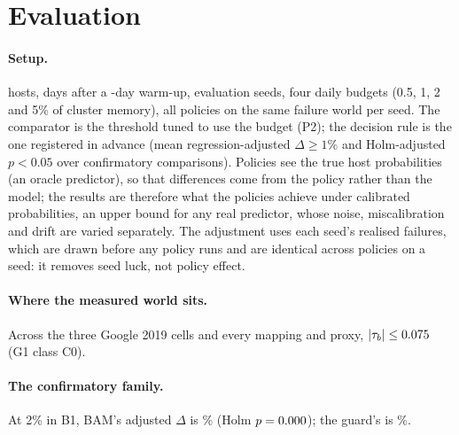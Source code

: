 \section{Evaluation}
\label{sec:eval}

\paragraph{Setup.}
\VHosts{} hosts, \VHorizonDays{} days after a \VWarmupDays-day warm-up, \VEvalSeeds{} evaluation
seeds, four daily budgets (0.5, 1, 2 and 5\% of cluster memory), all policies on the same failure
world per seed. The comparator is the threshold tuned to use the budget (P2); the decision rule is
the one registered in advance (mean regression-adjusted $\Delta \geq 1\%$ and Holm-adjusted
$p<0.05$ over \VFamilySize{} confirmatory comparisons). Policies see the true host probabilities (an
oracle predictor), so that differences come from the policy rather than the model; the results
are therefore what the policies achieve under calibrated probabilities, an upper bound for any
real predictor, whose noise, miscalibration and drift are varied separately. The adjustment uses
each seed's realised failures, which are drawn before any policy runs and are identical across
policies on a seed: it removes seed luck, not policy effect.

\paragraph{Where the measured world sits.}
Across the three Google 2019 cells and every mapping and proxy, $|\tau_b| \leq 0.075$
(G1 class C0).

\paragraph{The confirmatory family.}
At 2\% in B1, BAM's adjusted $\Delta$ is \VDeltaPFourBOneTwo\% (Holm $p=0.000$);
the guard's is \VDeltaPSixBOneTwo\%.

